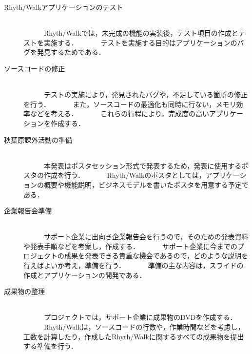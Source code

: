 \begin{description}
\item[Rhyth/Walkアプリケーションのテスト]\mbox{}\\
　　　Rhyth/Walkでは，未完成の機能の実装後，テスト項目の作成とテストを実施する．
　　　テストを実施する目的はアプリケーションのバグを発見するためである．

\item[ソースコードの修正]\mbox{}\\
　　　テストの実施により，発見されたバグや，不足している箇所の修正を行う．
　　　また，ソースコードの最適化も同時に行ない，メモリ効率などを考える．
　　　これらの行程により，完成度の高いアプリケーションを作成する．

\item[秋葉原課外活動の準備]\mbox{}\\
　　　本発表はポスタセッション形式で発表するため，発表に使用するポスタの作成を行う．
　　　Rhyth/Walkのポスタとしては，アプリケーションの概要や機能説明，ビジネスモデルを書いたポスタを用意する予定である．

\item[企業報告会準備]\mbox{}\\
　　　サポート企業に出向き企業報告会を行うので，そのための発表資料や発表手順などを考案し，作成する．
　　　サポート企業に今までのプロジェクトの成果を発表できる貴重な機会であるので，どのような説明を行えばよいか考え，準備を行う．
　　　準備の主な内容は，スライドの作成とアプリケーションの開発である．

\item[成果物の整理]\mbox{}\\
　　　プロジェクトでは，サポート企業に成果物のDVDを作成する．
　　　Rhyth/Walkは，ソースコードの行数や，作業時間などを考慮し，工数を計算したり，作成したRhyth/Walkに関するすべての成果物を提出する準備を行う．

\end{description}


